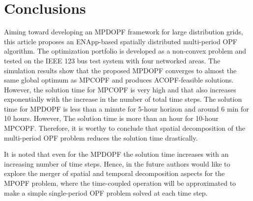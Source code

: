 \documentclass{article}
\begin{document}
\section{Conclusions}
Aiming toward developing an MPDOPF framework for large distribution grids, this article proposes an ENApp-based spatially distributed multi-period OPF algorithm. The optimization portfolio is developed as a non-convex problem and tested on the IEEE 123 bus test system with four networked areas. The simulation results show that the proposed MPDOPF converges to almost the same global optimum as MPCOPF and produces ACOPF-feasible solutions. However, the solution time for MPCOPF is very high and that also increases exponentially with the increase in the number of total time steps. The solution time for MPDOPF is less than a minute for 5-hour horizon and around 6 min for 10 hours. However, The solution time is more than an hour for 10-hour MPCOPF. Therefore, it is worthy to conclude that spatial decomposition of the multi-period OPF problem reduces the solution time drastically.  

It is noted that even for the MPDOPF the solution time increases with an increasing number of time steps. Hence, in the future authors would like to explore the merger of spatial and temporal decomposition aspects for the MPOPF problem, where the time-coupled operation will be approximated to make a simple single-period OPF problem solved at each time step. 
\end{document}
